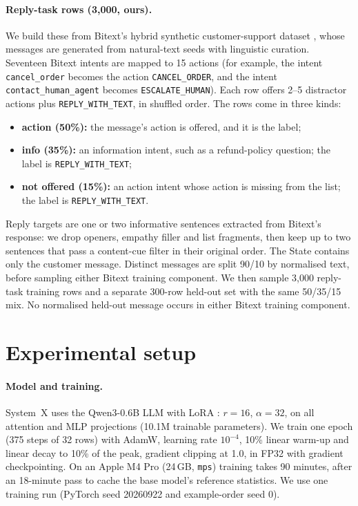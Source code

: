\documentclass[11pt]{article}
\newcommand{\reply}{\texttt{REPLY\_WITH\_TEXT}}
\begin{document}
\paragraph{Reply-task rows (3{,}000, ours).} We build these from Bitext's hybrid synthetic customer-support dataset \citep{bitext2024}, whose messages are generated from natural-text seeds with linguistic curation. Seventeen Bitext intents are mapped to 15 actions (for example, the intent \texttt{cancel\_order} becomes the action \texttt{CANCEL\_ORDER}, and the intent \texttt{contact\_human\_agent} becomes \texttt{ESCALATE\_HUMAN}). Each row offers 2--5 distractor actions plus \reply{}, in shuffled order. The rows come in three kinds:
\begin{itemize}
\item \textbf{action (50\%):} the message's action is offered, and it is the label;
\item \textbf{info (35\%):} an information intent, such as a refund-policy question; the label is \reply{};
\item \textbf{not offered (15\%):} an action intent whose action is missing from the list; the label is \reply{}.
\end{itemize}
Reply targets are one or two informative sentences extracted from Bitext's response: we drop openers, empathy filler and list fragments, then keep up to two sentences that pass a content-cue filter in their original order. The State contains only the customer message. Distinct messages are split 90/10 by normalised text, before sampling either Bitext training component. We then sample 3{,}000 reply-task training rows and a separate 300-row held-out set with the same 50/35/15 mix. No normalised held-out message occurs in either Bitext training component.

\section{Experimental setup}

\paragraph{Model and training.} System~X uses the Qwen3-0.6B LLM \citep{yang2025qwen3} with LoRA \citep{hu2022lora}: $r=16$, $\alpha=32$, on all attention and MLP projections (10.1M trainable parameters). We train one epoch (375 steps of 32 rows) with AdamW, learning rate $10^{-4}$, 10\% linear warm-up and linear decay to 10\% of the peak, gradient clipping at 1.0, in FP32 with gradient checkpointing. On an Apple M4 Pro (24\,GB, \texttt{mps}) training takes 90 minutes, after an 18-minute pass to cache the base model's reference statistics. We use one training run (PyTorch seed 20260922 and example-order seed 0).
\end{document}
